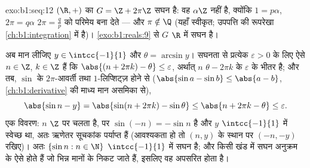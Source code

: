 \begin{solution}{exo:b1:seq:12}
$(\R, +)$ का  $G = \Z + 2\pi\Z$ सघन है: वह $\alpha\Z$ नहीं है, क्योंकि
$1 = p\alpha$, $2\pi = q\alpha$ $2\pi = \frac qp$ को परिमेय बना देते --- और
$\pi \notin \Q$ (यहाँ स्वीकृत; उपपत्ति की रूपरेखा \cref{ch:b1:integration}
में है)। \cref{exo:b1:reals:9} से $G$ $\R$ में सघन है।

अब मान लीजिए $y \in \intcc{-1}{1}$ और $\theta = \arcsin y$। सघनता से
प्रत्येक $\varepsilon > 0$ के लिए ऐसे $n \in \Z$, $k \in \Z$ हैं कि $\abs{(n
+ 2\pi k) - \theta} \leq \varepsilon$, अर्थात् $n$ $\theta - 2\pi k$ के
$\varepsilon$ के भीतर है; और तब, $\sin$ के $2\pi$-आवर्ती तथा $1$-लिप्शिट्ज़
होने से ($\abs{\sin a - \sin b} \leq \abs{a - b}$, \cref{ch:b1:derivative}
की माध्य मान असमिका से),
\[
\abs{\sin n - y} = \abs{\sin(n + 2\pi k) - \sin\theta}
\leq \abs{n + 2\pi k - \theta} \leq \varepsilon .
\]
एक विवरण: $n$ $\Z$ पर चलता है, पर $\sin(-n) = -\sin n$ है और $y$
$\intcc{-1}{1}$ में स्वेच्छ था, अतः ऋणेतर सूचकांक पर्याप्त हैं (आवश्यकता हो
तो $(n, y)$ के स्थान पर $(-n, -y)$ रखिए)। अतः $\{\sin n : n \in \N\}$
$\intcc{-1}{1}$ में सघन है; और किसी खंड में सघन अनुक्रम के ऐसे 
होते हैं जो भिन्न मानों के निकट जाते हैं, इसलिए वह अपसरित होता है।
\end{solution}

